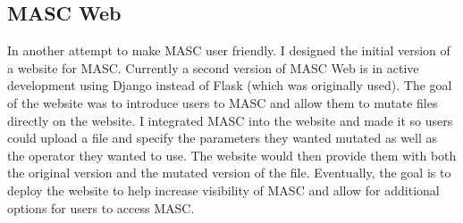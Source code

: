 \subsection{MASC Web}
\label{ch3:subsec:web}

In another attempt to make MASC user friendly. I designed the initial version of a website for MASC. Currently a second version of MASC Web is in active development using Django instead of Flask (which was originally used). The goal of the website was to introduce users to MASC and allow them to mutate files directly on the website. I integrated MASC into the website and made it so users could upload a file and specify the parameters they wanted mutated as well as the operator they wanted to use. The website would then provide them with both the original version and the mutated version of the file. Eventually, the goal is to deploy the website to help increase visibility of MASC and allow for additional options for users to access MASC.

